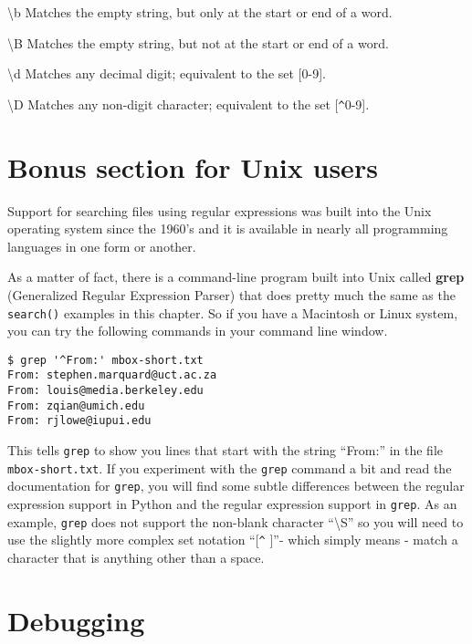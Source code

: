 {\textbackslash}b \newline
Matches the empty string, but only at the start or end of a word.

{\textbackslash}B \newline
Matches the empty string, but not at the start or end of a word.

{\textbackslash}d \newline
Matches any decimal digit; equivalent to the set [0-9].

{\textbackslash}D \newline
Matches any non-digit character; equivalent to the set [\verb"^"0-9].

\section{Bonus section for Unix users}

Support for searching files using regular expressions was built into the Unix operating system 
since the 1960's and it is available in nearly all programming languages in one form or another.

As a matter of fact, there is a command-line program built into Unix 
called {\bf grep} (Generalized Regular Expression Parser) that does pretty much 
the same as the {\tt search()} examples in this chapter.  So if you have a 
Macintosh or Linux system, you can try the following commands in your command line window.

\beforeverb
\begin{verbatim}
$ grep '^From:' mbox-short.txt
From: stephen.marquard@uct.ac.za
From: louis@media.berkeley.edu
From: zqian@umich.edu
From: rjlowe@iupui.edu
\end{verbatim}
\afterverb
%
This tells {\tt grep} to show you lines that start with the string ``From:'' in the file {\tt mbox-short.txt}.   If you experiment with the {\tt grep} command a bit and read the documentation for {\tt grep}, you will find some subtle differences between the regular expression support in Python and the regular expression support in {\tt grep}.  As an example, {\tt grep} does not support the non-blank character ``{\textbackslash}S'' so you will need to use the slightly more complex set notation ``[\verb"^" ]''- which simply means - match a character that is anything other than a space.

\section{Debugging}

